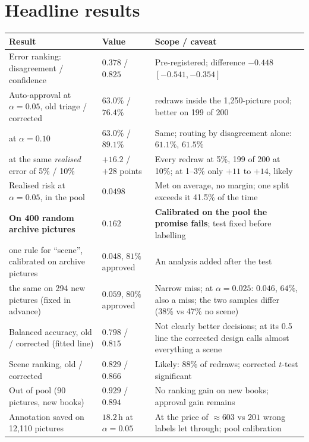 \documentclass[10pt,a4paper]{article}
\begin{document}
\section{Headline results}
\begin{center}\footnotesize
\begin{tabular}{>{\raggedright\arraybackslash}p{5.7cm} >{\raggedright\arraybackslash}p{3.4cm} >{\raggedright\arraybackslash}p{7.6cm}}
\toprule
\textbf{Result} & \textbf{Value} & \textbf{Scope / caveat} \\
\midrule
Error ranking: disagreement / confidence & $0.378$ / $0.825$ & Pre-registered; difference $-0.448$ $[-0.541,-0.354]$ \\
Auto-approval at $\alpha=0.05$, old triage / corrected & $63.0\%$ / $76.4\%$ & 200 redraws inside the 1,250-picture pool; better on 199 of 200 \\
\quad at $\alpha=0.10$ & $63.0\%$ / $89.1\%$ & Same; routing by disagreement alone: $61.1\%$, $61.5\%$ \\
\quad at the same \emph{realised} error of 5\% / 10\% & $+16.2$ / $+28$ points & Every redraw at 5\%, 199 of 200 at 10\%; at 1--3\% only $+11$ to $+14$, likely \\
Realised risk at $\alpha=0.05$, in the pool & $0.0498$ & Met on average, no margin; one split exceeds it 41.5\% of the time \\
\textbf{On 400 random archive pictures} & $0.162$ & \textbf{Calibrated on the pool the promise fails}; test fixed before labelling \\
\quad one rule for ``scene'', calibrated on archive pictures & $0.048$, $81\%$ approved & An analysis added after the test \\
\quad the same on 294 new pictures (fixed in advance) & $0.059$, $80\%$ approved & Narrow miss; at $\alpha{=}0.025$: $0.046$, $64\%$, also a miss; the two samples differ (38\% vs 47\% no scene) \\
Balanced accuracy, old / corrected (fitted line) & $0.798$ / $0.815$ & Not clearly better decisions; at its 0.5 line the corrected design calls almost everything a scene \\
Scene ranking, old / corrected & $0.829$ / $0.866$ & Likely: 88\% of redraws; corrected $t$-test significant \\
Out of pool (90 pictures, new books) & $0.929$ / $0.894$ & No ranking gain on new books; approval gain remains \\
Annotation saved on 12,110 pictures & $18.2$\,h at $\alpha{=}0.05$ & At the price of $\approx603$ vs $201$ wrong labels let through; pool calibration \\

\end{tabular}
\end{center}
\end{document}
